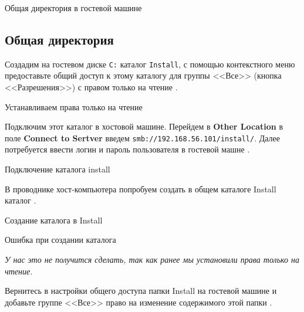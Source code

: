 \begin{image}
	\caption{Общая директория в гостевой машине}
	\label{fig:shared:dir:file:win}
\end{image}

\subsection{Общая директория}

Создадим на гостевом диске \texttt{С:} каталог \texttt{Install},
с помощью контекстного меню предоставьте общий доступ
к этому каталогу для группы <<Все>> (кнопка <<Разрешения>>)
с правом только на чтение .

\begin{image}
	\caption{Устанавливаем права только на чтение}
	\label{fig:dir:inst:r}
\end{image}

Подключим этот каталог в хостовой машине. Перейдем в \textbf{Other Location}
в поле \textbf{Connect to Sertver} введем
\texttt{smb://192.168.56.101/install/}.
Далее потребуется ввести логин и пароль пользователя в гостевой машне
.

\begin{image}
	\caption{Подключение каталога install}
	\label{fig:dir:inst:open}
\end{image}

В проводнике хост-компьютера попробуем создать
в общем каталоге Install каталог
.

\begin{image}
	\caption{Создание каталога в Install}
	\label{fig:dir:inst:r:create:folder}
\end{image}

\begin{image}
	\caption{Ошибка при создании каталога}
	\label{fig:dir:inst:r:create:folder:error}
\end{image}

\textit{У нас это не получится сделать,
так как ранее мы установили права только на чтение.}

Вернитесь в настройки общего доступа папки Install на гостевой машине
и добавьте группе <<Все>> право на изменение содержимого этой папки
.

